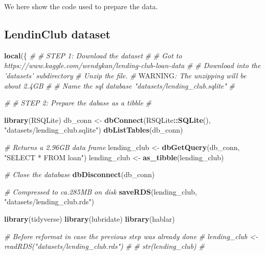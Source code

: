 \documentclass[11pt,]{report}
\newenvironment{Shaded}{\begin{snugshade}}{\end{snugshade}}
\newcommand{\AlertTok}[1]{\textcolor[rgb]{0.94,0.16,0.16}{#1}}
\newcommand{\CommentTok}[1]{\textcolor[rgb]{0.56,0.35,0.01}{\textit{#1}}}
\newcommand{\KeywordTok}[1]{\textcolor[rgb]{0.13,0.29,0.53}{\textbf{#1}}}
\newcommand{\NormalTok}[1]{#1}
\newcommand{\OperatorTok}[1]{\textcolor[rgb]{0.81,0.36,0.00}{\textbf{#1}}}
\newcommand{\StringTok}[1]{\textcolor[rgb]{0.31,0.60,0.02}{#1}}
\begin{document}
We here show the code used to prepare the data.

\hypertarget{lendinclub-dataset}{%
\subsection{LendinClub dataset}\label{lendinclub-dataset}}

\small

\begin{Shaded}
\begin{Highlighting}[numbers=left,,]
\KeywordTok{local}\NormalTok{(\{}
  \CommentTok{#}
  \CommentTok{# STEP 1: Download the dataset}
  \CommentTok{#}
  \CommentTok{#   Got to https://www.kaggle.com/wendykan/lending-club-loan-data}
  \CommentTok{#}
  \CommentTok{#   Download into the 'datasets' subdirectory}
  \CommentTok{#   Unzip the file.}
  \CommentTok{#   }\AlertTok{WARNING}\CommentTok{: The unzipping will be about 2.4GB}
  \CommentTok{#}
  \CommentTok{#   Name the sql database "datasets/lending_club.sqlite"}
  \CommentTok{#}
  
  \CommentTok{#}
  \CommentTok{# STEP 2: Prepare the dabase as a tibble}
  \CommentTok{#}
  
  \KeywordTok{library}\NormalTok{(RSQLite)}
\NormalTok{  db_conn <-}
\StringTok{    }\KeywordTok{dbConnect}\NormalTok{(RSQLite}\OperatorTok{::}\KeywordTok{SQLite}\NormalTok{(), }\StringTok{"datasets/lending_club.sqlite"}\NormalTok{)}
  \KeywordTok{dbListTables}\NormalTok{(db_conn)}
  
  \CommentTok{# Returns a 2.96GB data frame}
\NormalTok{  lending_club <-}\StringTok{ }\KeywordTok{dbGetQuery}\NormalTok{(db_conn, }\StringTok{"SELECT * FROM loan"}\NormalTok{)}
\NormalTok{  lending_club <-}\StringTok{ }\KeywordTok{as_tibble}\NormalTok{(lending_club)}
  
  \CommentTok{# Close the database}
  \KeywordTok{dbDisconnect}\NormalTok{(db_conn)}
  
  \CommentTok{# Compressed to ca.285MB on disk}
  \KeywordTok{saveRDS}\NormalTok{(lending_club, }\StringTok{"datasets/lending_club.rds"}\NormalTok{)}
  
  
  \KeywordTok{library}\NormalTok{(tidyverse)}
  \KeywordTok{library}\NormalTok{(lubridate)}
  \KeywordTok{library}\NormalTok{(hablar)}
  
  \CommentTok{# Before reformat in case the previous step was already done}
  \CommentTok{# lending_club <- readRDS("datasets/lending_club.rds")}
  \CommentTok{#}
  \CommentTok{# str(lending_club)}
  \CommentTok{#}
  

\end{Highlighting}
\end{Shaded}
\end{document}
